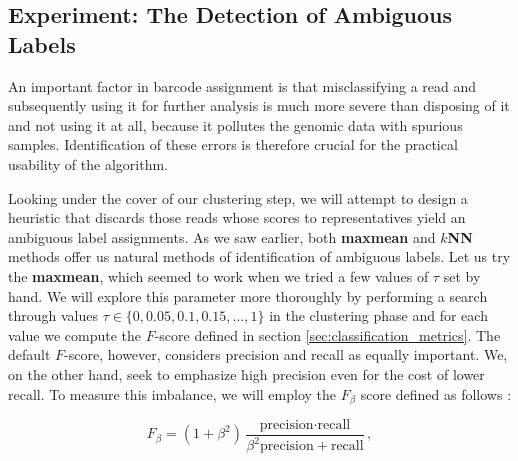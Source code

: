 

\subsection{Experiment: The Detection of Ambiguous Labels}
An important factor in barcode assignment is that misclassifying a read and subsequently using it for further analysis is much more severe than disposing of it and not using it at all, because it pollutes the genomic data with spurious samples. Identification of these errors is therefore crucial for the practical usability of the algorithm.

Looking under the cover of our clustering step, we will attempt to design a heuristic that discards those reads whose scores to representatives yield an ambiguous label assignments. As we saw earlier, both \textbf{maxmean} and \textbf{$k$NN} methods offer us natural methods of identification of ambiguous labels. Let us try the \textbf{maxmean}, which seemed to work when we tried a few values of $\tau$ set by hand. We will explore this parameter more thoroughly by performing a search through values $\tau \in \{0, 0.05, 0.1, 0.15,... , 1 \}$ in the clustering phase and for each value we compute the $F$-score defined in section \ref{sec:classification_metrics}. The default $F$-score, however, considers precision and recall as equally important. We, on the other hand, seek to emphasize high precision even for the cost of lower recall. To measure this imbalance, we will employ the $F_{\beta}$ score defined as follows \cite{tharwat2018classification, fbetascore}:

\begin{equation}
F_{\beta} = (1 + \beta^2) \frac{\text{precision} \cdot \text{recall}}{\beta^2 \text{precision}  + \text{recall}},
\end{equation}

